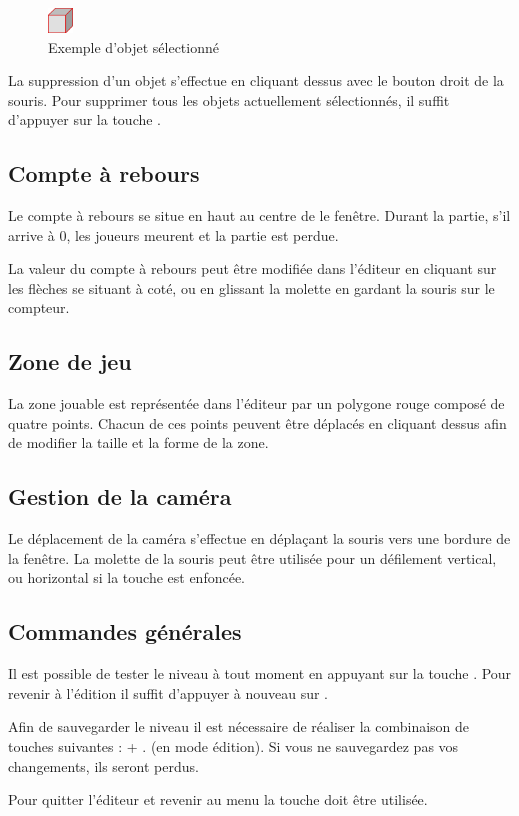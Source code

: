 \begin{figure}[h]
    \centering
    \includegraphics[width=25px]{figures/manuel-selected-block.png}
    \caption{Exemple d'objet sélectionné}
    \label{fig:manuel-selection}
\end{figure}

La suppression d'un objet s'effectue en cliquant dessus avec le bouton
droit de la souris. Pour supprimer tous les objets actuellement sélectionnés,
il suffit d'appuyer sur la touche .

\subsection{Compte à rebours}

Le compte à rebours se situe en haut au centre de le fenêtre. Durant la partie,
s'il arrive à 0, les joueurs meurent et la partie est perdue.

La valeur du compte à rebours peut être modifiée dans l'éditeur en cliquant
sur les flèches se situant à coté, ou en glissant la molette en gardant la
souris sur le compteur.

\subsection{Zone de jeu}

La zone jouable est représentée dans l'éditeur par un polygone
rouge composé de quatre points. Chacun de ces points peuvent être
déplacés en cliquant dessus afin de modifier la taille et la
forme de la zone.

\subsection{Gestion de la caméra}

Le déplacement de la caméra s'effectue en déplaçant la souris vers
une bordure de la fenêtre. La molette de la souris peut être utilisée
pour un défilement vertical, ou horizontal si la touche 
est enfoncée.

\subsection{Commandes générales}

Il est possible de tester le niveau à tout moment en appuyant sur la
touche . Pour revenir à l'édition il suffit d'appuyer à
nouveau sur .

Afin de sauvegarder le niveau il est nécessaire de réaliser la
combinaison de touches suivantes :  + . (en mode édition).
Si vous ne sauvegardez pas vos changements, ils seront perdus.

Pour quitter l’éditeur et revenir au menu la touche  doit être utilisée.
